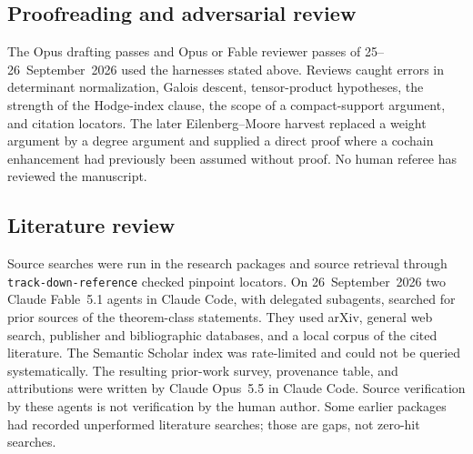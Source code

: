 \documentclass[11pt]{amsart}
\theoremstyle{plain}
\theoremstyle{definition}
\theoremstyle{remark}
\numberwithin{equation}{section}
\begin{document}
\subsection{Proofreading and adversarial review}
The Opus drafting passes and Opus or Fable reviewer passes of
25--26~September~2026 used the harnesses stated above. Reviews caught
errors in determinant normalization, Galois descent, tensor-product
hypotheses, the strength of the Hodge-index clause, the scope of a
compact-support argument, and citation locators. The later
Eilenberg--Moore harvest replaced a weight argument by a degree argument
and supplied a direct proof where a cochain enhancement had previously
been assumed without proof. No human referee has reviewed the manuscript.

\subsection{Literature review}
Source searches were run in the research packages and source retrieval
through \nolinkurl{track-down-reference} checked pinpoint locators. On
26~September~2026 two Claude Fable~5.1 agents in Claude Code, with delegated
subagents, searched for prior sources of the theorem-class statements.
They used arXiv, general web search, publisher and bibliographic databases,
and a local corpus of the cited literature. The Semantic Scholar index
was rate-limited and could not be queried systematically. The resulting
prior-work survey, provenance table, and attributions were written by
Claude Opus~5.5 in Claude Code. Source verification by these agents is not
verification by the human author. Some earlier packages had recorded
unperformed literature searches; those are gaps, not zero-hit searches.
\end{document}
